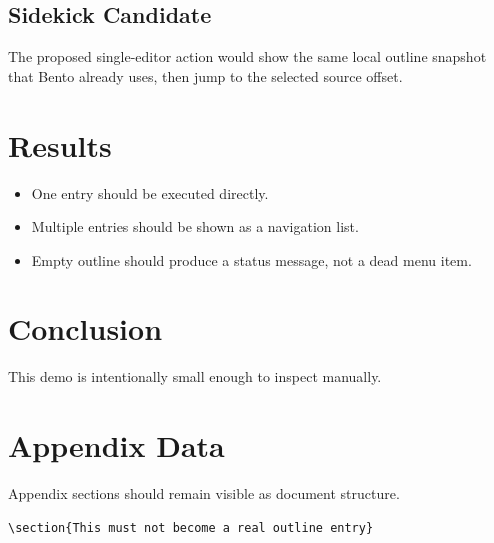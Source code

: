 \documentclass{article}
\begin{document}
\subsection{Sidekick Candidate}

The proposed single-editor action would show the same local outline snapshot
that Bento already uses, then jump to the selected source offset.

\section{Results}

\begin{itemize}
  \item One entry should be executed directly.
  \item Multiple entries should be shown as a navigation list.
  \item Empty outline should produce a status message, not a dead menu item.
\end{itemize}

\section{Conclusion}

This demo is intentionally small enough to inspect manually.

\appendix

\section{Appendix Data}

Appendix sections should remain visible as document structure.

\begin{verbatim}
\section{This must not become a real outline entry}
\end{verbatim}
\end{document}
